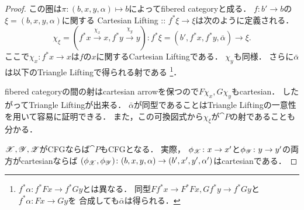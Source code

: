 \documentclass[a4paper, dvipdfmx]{jsarticle}
\begin{document}
\begin{proof}
    この圏は$\pi \colon (b,x,y,\alpha) \mapsto b$によってfibered categoryと成る．
    $f \colon b' \to b$の$\xi=(b, x, y, \alpha)$に関する
    Cartesian Lifting :: $f^*\xi \to \xi$は次のように定義される．
    \[
        \chi_{\xi}=(f^*x \xrightarrow{\chi_x} x, f^*y \xrightarrow{\chi_y} y)
        \colon
        f^*\xi=(b', f^*x, f^*y, \bar{\alpha}) \to \xi.
    \]
    ここで$\chi_x \colon f^*x \to x$は$f$の$x$に関するCartesian Liftingである．
    $\chi_y$も同様．
    さらに$\bar{\alpha}$は以下のTriangle Liftingで得られる射である
    \footnote
    {
        $f^*\alpha \colon f^*Fx \to f^*Gy$とは異なる．
        同型$Ff^*x \to F^*Fx, Gf^*y \to f^*Gy$と$f^*\alpha \colon Fx \to Gy$を
        合成しても$\bar{\alpha}$は得られる．
    }．
    \begin{center}
    \end{center}
    fibered categoryの間の射はcartesian arrowを保つので$F\chi_x, G\chi_y$もcartesian．
    したがってTriangle Liftingが出来る．
    $\bar{\alpha}$が同型であることはTriangle Liftingの一意性を用いて容易に証明できる．
    また，この可換図式から$\chi_{\xi}$が$\cat{P}$の射であることも分かる．

    $\mathscr{X}, \mathscr{Y}, \mathscr{Z}$がCFGならば$\cat{P}$もCFGとなる．
    実際，
    $\phi_{\mathscr{X}} \colon x \to x'$と$\phi_{\mathscr{Y}} \colon y \to y'$の両方がcartesianならば
    $(\phi_{\mathscr{X}}, \phi_{\mathscr{Y}}) \colon (b, x, y, \alpha) \to (b', x', y', \alpha')$はcartesianである．


\end{proof}
\end{document}
